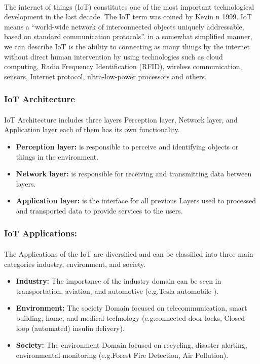 \documentclass[12pt, oneside, a4paper]{book}
\newcommand\boldcolor[1]{\textcolor{bold}{\textbf{#1}}}
\begin{document}
			\paragraph{}The internet of things (IoT) constitutes one of the most important technological
			development in the last decade. The IoT term was coined by Kevin n 1999\cite{iot_1}. IoT
			means a “world-wide network of interconnected objects uniquely addressable, based
			on standard communication protocols”\cite{iot_2}. in a somewhat simplified manner, we
			can describe IoT is the ability to connecting as many things by the internet without
			direct human intervention by using technologies such as cloud computing, Radio
			Frequency Identification (RFID), wireless communication, sensors, Internet
			protocol, ultra-low-power processors and others\cite{iot_3}.
			\subsubsection{IoT Architecture}
			\paragraph{} IoT Architecture includes three layers Perception layer, Network layer, and
			Application layer each of them has its own functionality.
			\begin{itemize}
				\item \boldcolor{Perception layer:} is responsible to perceive and identifying objects or things in the
				environment.
				\item \boldcolor{Network layer:} is responsible for receiving and transmitting data between layers.
				\item \boldcolor{Application layer:} is the interface for all previous Layers used to processed and
				transported data to provide services to the users\cite{iot_4}.
			\end{itemize}
			\subsubsection{IoT Applications:}
			\paragraph{}The Applications of the IoT are diversified and can be classified into three main
			categories industry, environment, and society.
			\begin{itemize}
			\item \boldcolor{Industry:} The importance of the industry domain can be seen in transportation,
			aviation, and automotive (e.g.Tesla automobile ).
			\item \boldcolor{Environment:} The society Domain focused on telecommunication, smart building,
			home, and medical technology (e.g.connected door locks, Closed-loop (automated)
			insulin delivery).
			\item \boldcolor{Society:} The environment Domain focused on recycling, disaster alerting,
			environmental monitoring (e.g.Forest Fire Detection, Air Pollution)\cite{iot_5}.
			\end{itemize}
\end{document}
